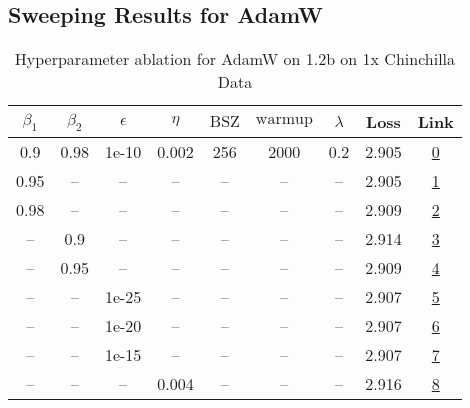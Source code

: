 \subsection{Sweeping Results for AdamW}%
\begin{table}[H]
\centering
\caption{Hyperparameter ablation for AdamW on 1.2b on 1x Chinchilla Data}
\label{tab:ablation_adamw_1.2b_1}
\begin{tabular}{ccccccccc}
\toprule
$\beta_1$ & $\beta_2$ & $\epsilon$ & $\eta$ & $\mathrm{BSZ}$ & $\mathrm{warmup}$ & $\lambda$ & Loss & Link \\
\midrule
0.9 & 0.98 & 1e-10 & 0.002 & 256 & 2000 & 0.2 & 2.905 & \href{https://wandb.ai/stanford-mercury/optimizer-scaling/runs/sweep-1.2b-24B-adamwf115b7lr0.002-wd0.2-minlr0-warmup2000-b10.9--387e9f}{0} \\
\midrule
0.95 & -- & -- & -- & -- & -- & -- & 2.905 & \href{https://wandb.ai/stanford-mercury/optimizer-scaling/runs/sweep-1.2b-24B-adamwf17f49lr0.002-wd0.2-minlr0-warmup2000-b10.95-444ce8}{1} \\
0.98 & -- & -- & -- & -- & -- & -- & 2.909 & \href{https://wandb.ai/stanford-mercury/optimizer-scaling/runs/sweep-1.2b-24B-adamwcce254flr0.002-wd0.2-minlr0-warmup2000-b10.9-744305}{2} \\
-- & 0.9 & -- & -- & -- & -- & -- & 2.914 & \href{https://wandb.ai/stanford-mercury/optimizer-scaling/runs/sweep-1.2b-24B-adamwf7d5fdlr0.002-wd0.2-minlr0-warmup2000-b10.9--2217ed}{3} \\
-- & 0.95 & -- & -- & -- & -- & -- & 2.909 & \href{https://wandb.ai/stanford-mercury/optimizer-scaling/runs/sweep-1.2b-24B-adamwa250dblr0.002-wd0.2-minlr0-warmup2000-b10.9--91a988}{4} \\
-- & -- & 1e-25 & -- & -- & -- & -- & 2.907 & \href{https://wandb.ai/stanford-mercury/optimizer-scaling/runs/sweep-1.2b-24B-adamwfb226elr0.002-wd0.2-minlr0-warmup2000-b10.9--56cdf6}{5} \\
-- & -- & 1e-20 & -- & -- & -- & -- & 2.907 & \href{https://wandb.ai/stanford-mercury/optimizer-scaling/runs/sweep-1.2b-24B-adamw269849lr0.002-wd0.2-minlr0-warmup2000-b10.9--f1a022}{6} \\
-- & -- & 1e-15 & -- & -- & -- & -- & 2.907 & \href{https://wandb.ai/stanford-mercury/optimizer-scaling/runs/sweep-1.2b-24B-adamwb9e3belr0.002-wd0.2-minlr0-warmup2000-b10.9--3d8fda}{7} \\
-- & -- & -- & 0.004 & -- & -- & -- & 2.916 & \href{https://wandb.ai/stanford-mercury/optimizer-scaling/runs/sweep-1.2b-24B-adamw1edd23lr0.004-wd0.2-minlr0.0-warmup2000-b10.-92a750}{8} \\

\end{tabular}
\end{table}
